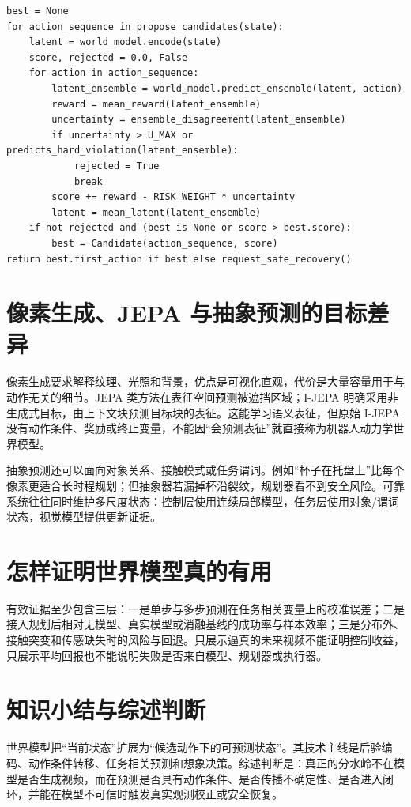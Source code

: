 \begin{lstlisting}[caption={带不确定性和硬约束的想象规划教学伪代码}]
best = None
for action_sequence in propose_candidates(state):
    latent = world_model.encode(state)
    score, rejected = 0.0, False
    for action in action_sequence:
        latent_ensemble = world_model.predict_ensemble(latent, action)
        reward = mean_reward(latent_ensemble)
        uncertainty = ensemble_disagreement(latent_ensemble)
        if uncertainty > U_MAX or predicts_hard_violation(latent_ensemble):
            rejected = True
            break
        score += reward - RISK_WEIGHT * uncertainty
        latent = mean_latent(latent_ensemble)
    if not rejected and (best is None or score > best.score):
        best = Candidate(action_sequence, score)
return best.first_action if best else request_safe_recovery()
\end{lstlisting}

\section{像素生成、JEPA 与抽象预测的目标差异}

像素生成要求解释纹理、光照和背景，优点是可视化直观，代价是大量容量用于与动作无关的细节。JEPA 类方法在表征空间预测被遮挡区域；I-JEPA 明确采用非生成式目标，由上下文块预测目标块的表征\cite{assran2023ijepa}。这能学习语义表征，但原始 I-JEPA 没有动作条件、奖励或终止变量，不能因“会预测表征”就直接称为机器人动力学世界模型。

抽象预测还可以面向对象关系、接触模式或任务谓词。例如“杯子在托盘上”比每个像素更适合长时程规划；但抽象器若漏掉杯沿裂纹，规划器看不到安全风险。可靠系统往往同时维护多尺度状态：控制层使用连续局部模型，任务层使用对象/谓词状态，视觉模型提供更新证据。

\section{怎样证明世界模型真的有用}

有效证据至少包含三层：一是单步与多步预测在任务相关变量上的校准误差；二是接入规划后相对无模型、真实模型或消融基线的成功率与样本效率；三是分布外、接触突变和传感缺失时的风险与回退。只展示逼真的未来视频不能证明控制收益，只展示平均回报也不能说明失败是否来自模型、规划器或执行器。

\section{知识小结与综述判断}

世界模型把“当前状态”扩展为“候选动作下的可预测状态”。其技术主线是后验编码、动作条件转移、任务相关预测和想象决策。综述判断是：真正的分水岭不在模型是否生成视频，而在预测是否具有动作条件、是否传播不确定性、是否进入闭环，并能在模型不可信时触发真实观测校正或安全恢复。

